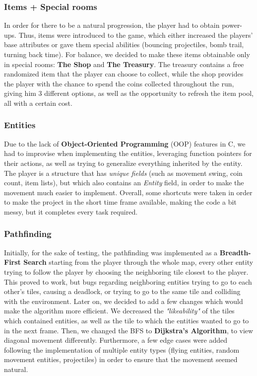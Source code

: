 \documentclass{article}
\begin{document}
\subsubsection{Items + Special rooms}
In order for there to be a natural progression, the player had to obtain power-ups. Thus, items were introduced to the game, which either increased the players' base attributes or gave them special abilities (bouncing projectiles, bomb trail, turning back time). For balance, we decided to make these items obtainable only in special rooms: \textbf{The Shop} and \textbf{The Treasury}. The treasury contains a free randomized item that the player can choose to collect, while the shop provides the player with the chance to spend the coins collected throughout the run, giving him 3 different options, as well as the opportunity to refresh the item pool, all with a certain cost.
\subsubsection{Entities}
Due to the lack of \textbf{Object-Oriented Programming} (OOP) features in C, we had to improvise when implementing the entities,
leveraging function pointers for their actions, as well as trying to generalize everything inherited by the entity. The player is a structure that has \textit{unique fields} (such as movement swing, coin count, item lists), but which also contains an \textit{Entity} field, in order to make the movement much easier to implement. Overall, some shortcuts were taken in order to make the project in the short time frame available, making the code a bit messy, but it completes every task required.
\subsubsection{Pathfinding}
Initially, for the sake of testing, the pathfinding was implemented as a \textbf{Breadth-First Search} starting from the player through the whole map, every other entity trying to follow the player by choosing the neighboring tile closest to the player. This proved to work, but bugs regarding neighboring entities trying to go to each other's tiles, causing a deadlock, or trying to go to the same tile and colliding with the environment. Later on, we decided to add a few changes which would make the algorithm more efficient. We decreased the \textit{"likeability"} of the tiles which contained entities, as well as the tile to which the entities wanted to go to in the next frame. Then, we changed the BFS to \textbf{Dijkstra's Algorithm}, to view diagonal movement differently. Furthermore, a few edge cases were added following the implementation of multiple entity types (flying entities, random movement entities, projectiles) in order to ensure that the movement seemed natural.
\end{document}
